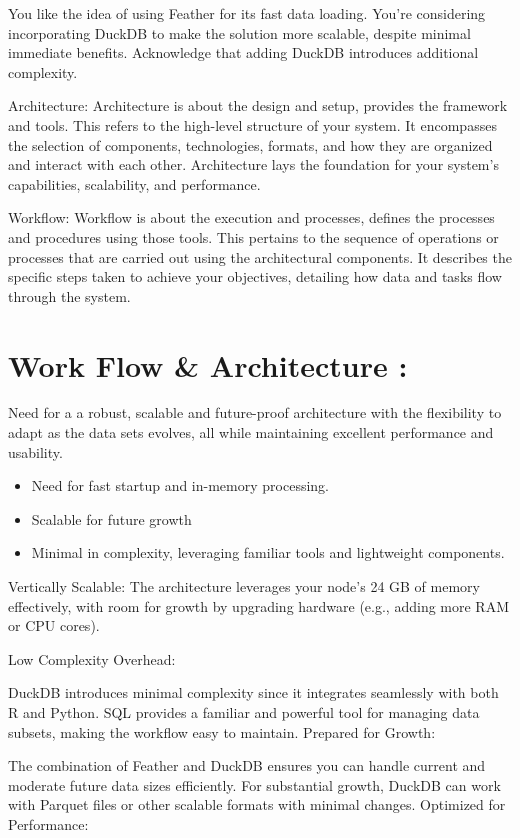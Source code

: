 \documentclass[
  american,
  10,
  a4paper,
]{book}
\providecommand{\tightlist}{%
  \setlength{\itemsep}{0pt}\setlength{\parskip}{0pt}}
\theoremstyle{definition}
\theoremstyle{remark}
\begin{document}
You like the idea of using Feather for its fast data loading. You're
considering incorporating DuckDB to make the solution more scalable,
despite minimal immediate benefits. Acknowledge that adding DuckDB
introduces additional complexity.

Architecture: Architecture is about the design and setup, provides the
framework and tools. This refers to the high-level structure of your
system. It encompasses the selection of components, technologies,
formats, and how they are organized and interact with each other.
Architecture lays the foundation for your system's capabilities,
scalability, and performance.

Workflow: Workflow is about the execution and processes, defines the
processes and procedures using those tools. This pertains to the
sequence of operations or processes that are carried out using the
architectural components. It describes the specific steps taken to
achieve your objectives, detailing how data and tasks flow through the
system.

\section{Work Flow \& Architecture :}\label{work-flow-architecture}

Need for a a robust, scalable and future-proof architecture with the
flexibility to adapt as the data sets evolves, all while maintaining
excellent performance and usability.

\begin{itemize}
\tightlist
\item
  Need for fast startup and in-memory processing.
\item
  Scalable for future growth
\item
  Minimal in complexity, leveraging familiar tools and lightweight
  components.
\end{itemize}

Vertically Scalable: The architecture leverages your node's 24 GB of
memory effectively, with room for growth by upgrading hardware (e.g.,
adding more RAM or CPU cores).

Low Complexity Overhead:

DuckDB introduces minimal complexity since it integrates seamlessly with
both R and Python. SQL provides a familiar and powerful tool for
managing data subsets, making the workflow easy to maintain. Prepared
for Growth:

The combination of Feather and DuckDB ensures you can handle current and
moderate future data sizes efficiently. For substantial growth, DuckDB
can work with Parquet files or other scalable formats with minimal
changes. Optimized for Performance:
\end{document}
